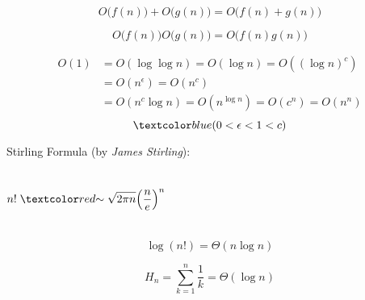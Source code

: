 \begin{frame}{}
  \[
    O\big(f(n)\big) + O\big(g(n)\big) = O\big(f(n) + g(n)\big)
  \]

  \pause
  \[
    O\big(f(n)\big) O\big(g(n)\big) = O\big(f(n) g(n)\big)
  \]
\end{frame}

\begin{frame}{}
  \begin{center}
  \end{center}

  \pause
  \begin{align*}
    O(1) &= O(\log \log n) = O(\log n) = O((\log n)^{c}) \\[6pt]
    &= O(n^{\epsilon}) = O(n^c) \\[6pt]
    &= O(n^{c} \log n) = O(n^{\log n}) = O(c^n) = O(n^n)
  \end{align*}
  \[
    \blue{(0 < \epsilon < 1 < c)}
  \]
\end{frame}

\begin{frame}{}
\end{frame}

\begin{frame}{}
  \begin{alertblock}{Stirling Formula (by {\it James Stirling}):}
    \begin{columns}
        \[
        n! \;\red{\sim}\; \sqrt{2 \pi n} \Big(\frac{n}{e}\Big)^{n}
        \]
    \end{columns}
  \end{alertblock}

  \pause
  \[
    \log(n!) = \Theta(n \log n)
  \]

  \pause
  \[
    H_n = \sum_{k=1}^{n} \frac{1}{k} = \Theta(\log n)
  \]
\end{frame}
